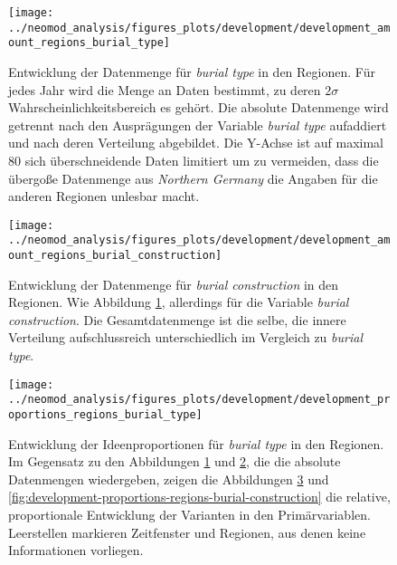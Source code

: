 \documentclass[openany,twoside,twocolumn]{book}
\begin{document}
\begin{figure}[!t]

{\centering \texttt{[image: ../neomod\_analysis/figures\_plots/development/development\_amount\_regions\_burial\_type]} 

}

\caption[Entwicklung der Datenmenge für \textit{burial type} in den Regionen]{Entwicklung der Datenmenge für \textit{burial type} in den Regionen. Für jedes Jahr wird die Menge an Daten bestimmt, zu deren $2\sigma$ Wahrscheinlichkeitsbereich es gehört. Die absolute Datenmenge wird getrennt nach den Ausprägungen der Variable \textit{burial type} aufaddiert und nach deren Verteilung abgebildet. Die Y-Achse ist auf maximal 80 sich überschneidende Daten limitiert um zu vermeiden, dass die übergoße Datenmenge aus \textit{Northern Germany} die Angaben für die anderen Regionen unlesbar macht.}\label{fig:development-amount-regions-burial-type}
\end{figure}

\begin{figure}[!t]

{\centering \texttt{[image: ../neomod\_analysis/figures\_plots/development/development\_amount\_regions\_burial\_construction]} 

}

\caption[Entwicklung der Datenmenge für \textit{burial construction} in den Regionen]{Entwicklung der Datenmenge für \textit{burial construction} in den Regionen. Wie Abbildung \ref{fig:development-amount-regions-burial-type}, allerdings für die Variable \textit{burial construction}. Die Gesamtdatenmenge ist die selbe, die innere Verteilung aufschlussreich unterschiedlich im Vergleich zu \textit{burial type}.}\label{fig:development-amount-regions-burial-construction}
\end{figure}

\begin{figure}[!t]

{\centering \texttt{[image: ../neomod\_analysis/figures\_plots/development/development\_proportions\_regions\_burial\_type]} 

}

\caption[Entwicklung der Ideenproportionen für \textit{burial type} in den Regionen]{Entwicklung der Ideenproportionen für \textit{burial type} in den Regionen. Im Gegensatz zu den Abbildungen \ref{fig:development-amount-regions-burial-type} und \ref{fig:development-amount-regions-burial-construction}, die die absolute Datenmengen wiedergeben, zeigen die Abbildungen \ref{fig:development-proportions-regions-burial-type} und \ref{fig:development-proportions-regions-burial-construction} die relative, proportionale Entwicklung der Varianten in den Primärvariablen. Leerstellen markieren Zeitfenster und Regionen, aus denen keine Informationen vorliegen.}\label{fig:development-proportions-regions-burial-type}
\end{figure}
\end{document}
